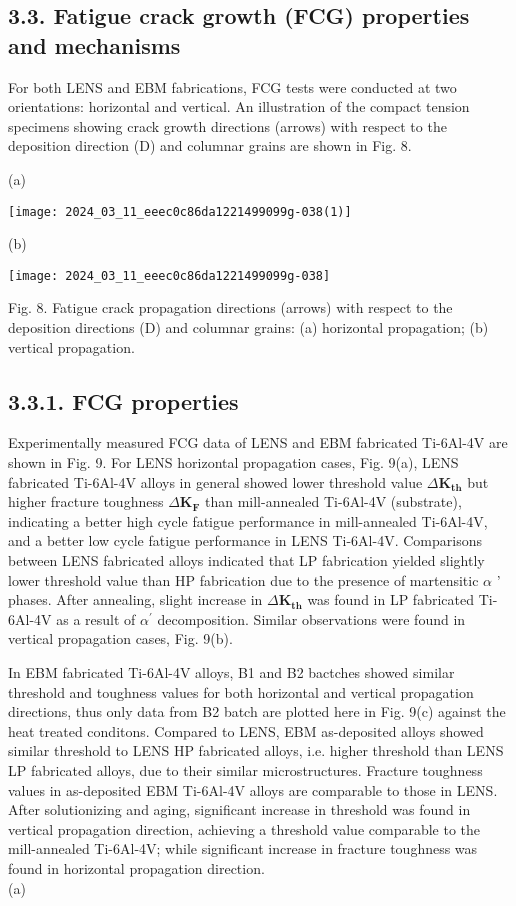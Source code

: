 \documentclass[10pt]{article}
\begin{document}
\subsection*{3.3. Fatigue crack growth (FCG) properties and mechanisms}
For both LENS and EBM fabrications, FCG tests were conducted at two orientations: horizontal and vertical. An illustration of the compact tension specimens showing crack growth directions (arrows) with respect to the deposition direction (D) and columnar grains are shown in Fig. 8.

(a)

\begin{center}
\texttt{[image: 2024\_03\_11\_eeec0c86da1221499099g-038(1)]}
\end{center}

(b)

\begin{center}
\texttt{[image: 2024\_03\_11\_eeec0c86da1221499099g-038]}
\end{center}

Fig. 8. Fatigue crack propagation directions (arrows) with respect to the deposition directions (D) and columnar grains: (a) horizontal propagation; (b) vertical propagation.

\subsection*{3.3.1. FCG properties}
Experimentally measured FCG data of LENS and EBM fabricated Ti-6Al-4V are shown in Fig. 9. For LENS horizontal propagation cases, Fig. 9(a), LENS fabricated Ti-6Al-4V alloys in general showed lower threshold value $\Delta \boldsymbol{K}_{\boldsymbol{t h}}$ but higher fracture toughness $\Delta \boldsymbol{K}_{\boldsymbol{F}}$ than mill-annealed Ti-6Al-4V (substrate), indicating a better high cycle fatigue performance in mill-annealed Ti-6Al-4V, and a better low cycle fatigue performance in LENS Ti-6Al-4V. Comparisons between LENS fabricated alloys indicated that LP fabrication yielded slightly lower threshold value than HP fabrication due to the presence of martensitic $\alpha$ ' phases. After annealing, slight increase in $\Delta \boldsymbol{K}_{\boldsymbol{t h}}$ was found in LP fabricated Ti-6Al-4V as a result of $\alpha^{\prime}$ decomposition. Similar observations were found in vertical propagation cases, Fig. 9(b).

In EBM fabricated Ti-6Al-4V alloys, B1 and B2 bactches showed similar threshold and toughness values for both horizontal and vertical propagation directions, thus only data from B2 batch are plotted here in Fig. 9(c) against the heat treated conditons. Compared to LENS, EBM as-deposited alloys showed similar threshold to LENS HP fabricated alloys, i.e. higher threshold than LENS LP fabricated alloys, due to their similar microstructures. Fracture toughness values in as-deposited EBM Ti-6Al-4V alloys are comparable to those in LENS. After solutionizing and aging, significant increase in threshold was found in vertical propagation direction, achieving a threshold value comparable to the mill-annealed Ti-6Al-4V; while significant increase in fracture toughness was found in horizontal propagation direction.\\
(a)
\end{document}
